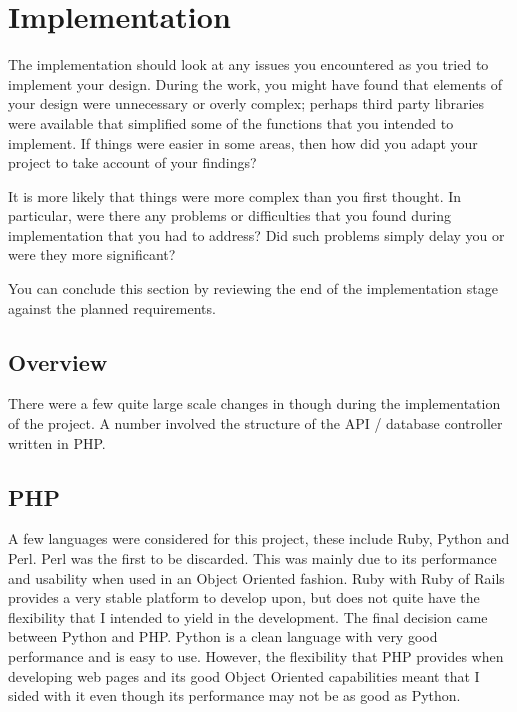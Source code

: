 \chapter{Implementation}

The implementation should look at any issues you encountered as you tried to implement your design. During the work, you might have found that elements of your design were unnecessary or overly complex; perhaps third party libraries were available that simplified some of the functions that you intended to implement. If things were easier in some areas, then how did you adapt your project to take account of your findings?

It is more likely that things were more complex than you first thought. In particular, were there any problems or difficulties that you found during implementation that you had to address? Did such problems simply delay you or were they more significant? 

You can conclude this section by reviewing the end of the implementation stage against the planned requirements. 

\section{Overview}
	There were a few quite large scale changes in though during the implementation of the project. A number involved the structure of the API / database controller written in PHP. 
	
\section{PHP}
	A few languages were considered for this project, these include Ruby, Python and Perl. Perl was the first to be discarded. This was mainly due to its performance and usability when used in an Object Oriented fashion. Ruby with Ruby of Rails provides a very stable platform to develop upon, but does not quite have the flexibility that I intended to yield in the development. The final decision came between Python and PHP. Python is a clean language with very good performance and is easy to use. However, the flexibility that PHP provides when developing web pages and its good Object Oriented capabilities meant that I sided with it even though its performance may not be as good as Python.
	
